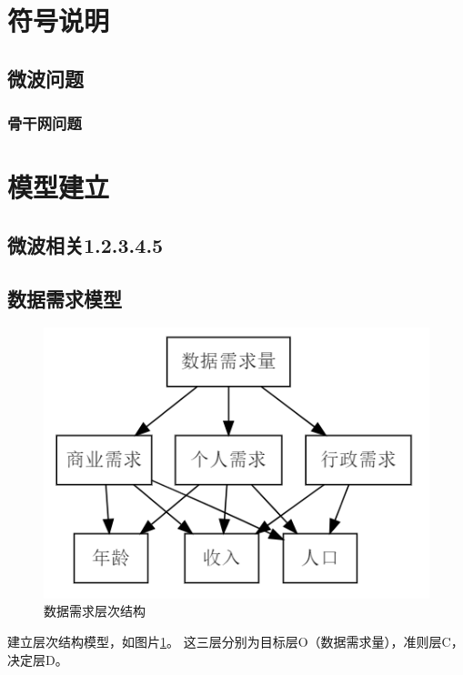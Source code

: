 \documentclass[UTF8,12pt]{ctexart}
\begin{document}
\section{符号说明}
    \subsection{微波问题}
    \subsubsection{骨干网问题}





\section{模型建立}
    \subsection{微波相关1.2.3.4.5}


    \subsection[数据需求模型]{数据需求模型}
            \begin{figure}[]
                    \centering
                    \includegraphics{need.png}
                    \caption{数据需求层次结构}\label{SJXQCCJG}
                \end{figure}
        建立层次结构模型，如图片\ref{SJXQCCJG}。                
        这三层分别为目标层O（数据需求量），准则层C，决定层D。
\end{document}
